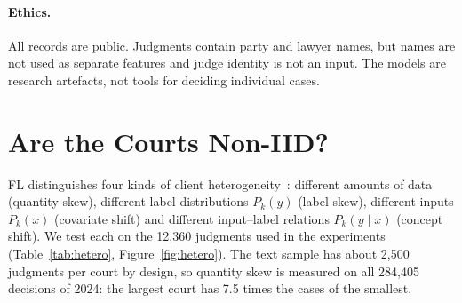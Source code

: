\documentclass[11pt,a4paper]{article}
\begin{document}
\paragraph{Ethics.} All records are public. Judgments contain party and lawyer names, but names are not
used as separate features and judge identity is not an input. The models are research artefacts, not
tools for deciding individual cases.

\section{Are the Courts Non-IID?}
\label{sec:hetero}
FL distinguishes four kinds of client heterogeneity~\cite{kairouz2021advances}: different amounts of
data (quantity skew), different label distributions $P_k(y)$ (label skew), different inputs $P_k(x)$
(covariate shift) and different input--label relations $P_k(y\mid x)$ (concept shift). We test each on
the 12,360 judgments used in the experiments (Table~\ref{tab:hetero}, Figure~\ref{fig:hetero}). The text
sample has about 2,500 judgments per court by design, so quantity skew is measured on all 284,405
decisions of 2024: the largest court has 7.5 times the cases of the smallest.
\end{document}
